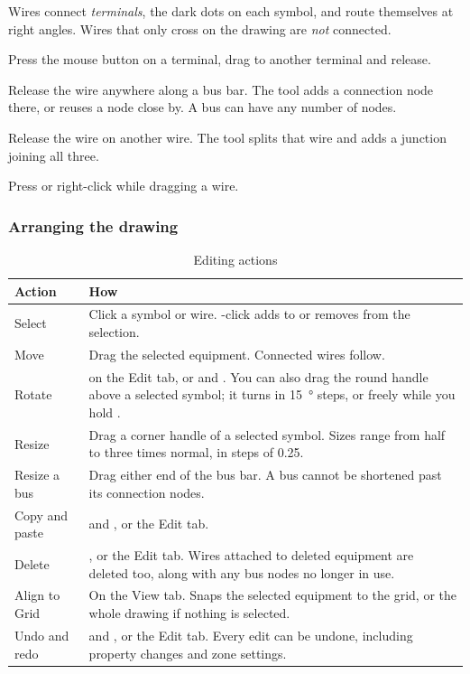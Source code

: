 Wires connect \emph{terminals}, the dark dots on each symbol, and route themselves at
right angles. Wires that only cross on the drawing are \emph{not} connected.

\begin{description}[style=nextline, leftmargin=1.2em]
  \item[Terminal to terminal]
    Press the mouse button on a terminal, drag to another terminal and release.
  \item[To a bus]
    Release the wire anywhere along a bus bar. The tool adds a connection node there,
    or reuses a node close by. A bus can have any number of nodes.
  \item[Into an existing wire (tee)]
    Release the wire on another wire. The tool splits that wire and adds a junction
    joining all three.
  \item[Cancelling]
    Press  or right-click while dragging a wire.
\end{description}

\subsubsection{Arranging the drawing}

\begin{table}[H]
  \centering
  \caption{Editing actions}
  \label{tab:editing}
  \begin{tabularx}{\textwidth}{l L}
    \toprule
    \textbf{Action} & \textbf{How} \\
    \midrule
    Select & Click a symbol or wire. -click adds to or removes from the selection. \\
    Move & Drag the selected equipment. Connected wires follow. \\
    Rotate &  on the Edit tab, or  and . You can also drag the round handle above a selected symbol; it turns in \SI{15}{\degree} steps, or freely while you hold . \\
    Resize & Drag a corner handle of a selected symbol. Sizes range from half to three times normal, in steps of 0.25. \\
    Resize a bus & Drag either end of the bus bar. A bus cannot be shortened past its connection nodes. \\
    Copy and paste &  and , or the Edit tab. \\
    Delete & ,  or the Edit tab. Wires attached to deleted equipment are deleted too, along with any bus nodes no longer in use. \\
    Align to Grid & On the View tab. Snaps the selected equipment to the grid, or the whole drawing if nothing is selected. \\
    Undo and redo &  and , or the Edit tab. Every edit can be undone, including property changes and zone settings. \\
    \bottomrule
  \end{tabularx}
\end{table}

